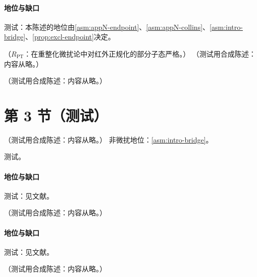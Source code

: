 \paragraph{地位与缺口}测试：本陈述的地位由\cref{asm:appN-endpoint}、\cref{asm:appN-collins}、\cref{asm:intro-bridge}、\cref{prop:excl-endpoint}决定。

\begin{proposition}\label{prop:excl-pion-lo}
（$R_{\mathrm{PT}}$：在重整化微扰论中对红外正规化的部分子态严格。）
（测试用合成陈述：内容从略。）
\end{proposition}

\begin{example}\label{ex:excl-pion-ff-lo}
（测试用合成陈述：内容从略。）
\end{example}

\section{第 3 节（测试）}\label{sec:excl-ff}

\begin{theorem}\label{thm:excl-transition}
（测试用合成陈述：内容从略。）
非微扰地位：\cref{asm:intro-bridge}。
\end{theorem}
\begin{proofsketch}测试。\end{proofsketch}
\paragraph{地位与缺口}测试：见文献。

\begin{proposition}\label{prop:excl-endpoint}
（测试用合成陈述：内容从略。）
\end{proposition}
\paragraph{地位与缺口}测试：见文献。

\begin{definition}[广义部分子分布]\label{def:excl-gpd}
（测试用合成陈述：内容从略。）
\end{definition}

